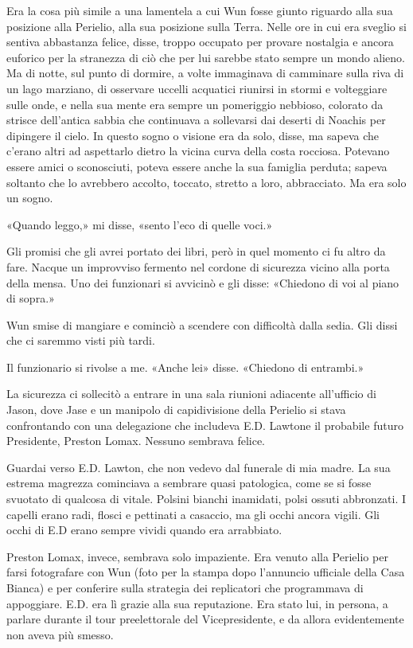 Era la cosa più simile a una lamentela a cui Wun fosse giunto riguardo
alla sua posizione alla Perielio, alla sua posizione sulla Terra. Nelle
ore in cui era sveglio si sentiva abbastanza felice, disse, troppo
occupato per provare nostalgia e ancora euforico per la stranezza di ciò
che per lui sarebbe stato sempre un mondo alieno. Ma di notte, sul punto
di dormire, a volte immaginava di camminare sulla riva di un lago
marziano, di osservare uccelli acquatici riunirsi in stormi e
volteggiare sulle onde, e nella sua mente era sempre un pomeriggio
nebbioso, colorato da strisce dell'antica sabbia che continuava a
sollevarsi dai deserti di Noachis per dipingere il cielo. In questo
sogno o visione era da solo, disse, ma sapeva che c'erano altri ad
aspettarlo dietro la vicina curva della costa rocciosa. Potevano essere
amici o sconosciuti, poteva essere anche la sua famiglia perduta; sapeva
soltanto che lo avrebbero accolto, toccato, stretto a loro, abbracciato.
Ma era solo un sogno.

«Quando leggo,» mi disse, «sento l'eco di quelle voci.»

Gli promisi che gli avrei portato dei libri, però in quel momento ci fu
altro da fare. Nacque un improvviso fermento nel cordone di sicurezza
vicino alla porta della mensa. Uno dei funzionari si avvicinò e gli
disse: «Chiedono di voi al piano di sopra.»

Wun smise di mangiare e cominciò a scendere con difficoltà dalla sedia.
Gli dissi che ci saremmo visti più tardi.

Il funzionario si rivolse a me. «Anche lei» disse. «Chiedono di
entrambi.»

\separatorefiori

La sicurezza ci sollecitò a entrare in una sala riunioni adiacente
all'ufficio di Jason, dove Jase e un manipolo di capidivisione della
Perielio si stava confrontando con una delegazione che includeva E.D.
Lawtone il probabile futuro Presidente, Preston Lomax. Nessuno sembrava
felice.

Guardai verso E.D. Lawton, che non vedevo dal funerale di mia madre. La
sua estrema magrezza cominciava a sembrare quasi patologica, come se si
fosse svuotato di qualcosa di vitale. Polsini bianchi inamidati, polsi
ossuti abbronzati. I capelli erano radi, flosci e pettinati a casaccio,
ma gli occhi ancora vigili. Gli occhi di E.D erano sempre vividi quando
era arrabbiato.

Preston Lomax, invece, sembrava solo impaziente. Era venuto alla
Perielio per farsi fotografare con Wun (foto per la stampa dopo
l'annuncio ufficiale della Casa Bianca) e per conferire sulla strategia
dei replicatori che programmava di appoggiare. E.D. era lì grazie alla
sua reputazione. Era stato lui, in persona, a parlare durante il tour
preelettorale del Vicepresidente, e da allora evidentemente non aveva
più smesso.

